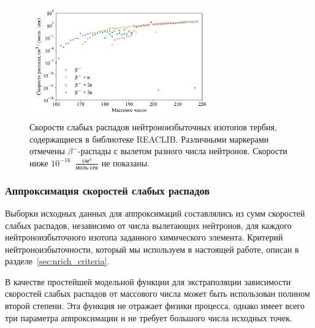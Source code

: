 \begin{figure}
  \centering
  \includegraphics[width=0.7\textwidth]{../pics/decays_tb.pdf}
  \caption{Скорости слабых распадов нейтроноизбыточных изотопов тербия, содержащиеся в библиотеке REACLIB. Различными маркерами отмечены $\beta^-$-распады с вылетом разного числа нейтронов. Скорости ниже $10^{-16}$~$\frac{\text{см}^3}{\text{моль}\cdot\text{сек}}$ не показаны.}
  \label{img:decays_tb}
\end{figure}

\subsubsection{Аппроксимация скоростей слабых распадов}
  Выборки исходных данных для аппроксимаций составлялись из сумм скоростей слабых распадов, независимо от числа вылетающих нейтронов, для каждого нейтроноизбыточного изотопа заданного химического элемента. Критерий нейтроноизбыточности, который мы используем в настоящей работе, описан в разделе~\ref{sec:nrich_criteria}.
  
  В качестве простейшей модельной функции для экстраполяции зависимости скоростей слабых распадов от массового числа может быть использован полином второй степени. Эта функция не отражает физики процесса, однако имеет всего три параметра аппроксимации и не требует большого числа исходных точек. 

